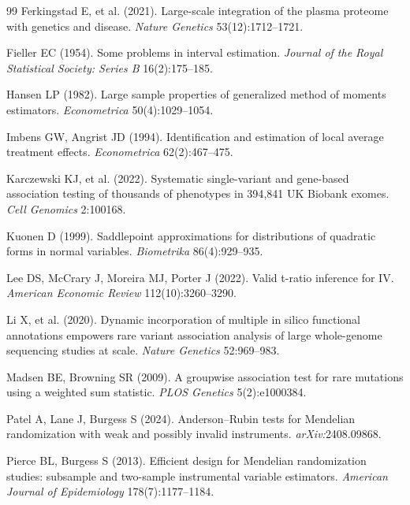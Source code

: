 \documentclass[11pt]{article}
\begin{document}
\begin{thebibliography}{99}
Ferkingstad E, et al. (2021). Large-scale integration of the plasma proteome with genetics and disease. \emph{Nature Genetics} 53(12):1712--1721.

Fieller EC (1954). Some problems in interval estimation. \emph{Journal of the Royal Statistical Society: Series B} 16(2):175--185.

Hansen LP (1982). Large sample properties of generalized method of moments estimators. \emph{Econometrica} 50(4):1029--1054.

Imbens GW, Angrist JD (1994). Identification and estimation of local average treatment effects. \emph{Econometrica} 62(2):467--475.

Karczewski KJ, et al. (2022). Systematic single-variant and gene-based association testing of thousands of phenotypes in 394{,}841 UK Biobank exomes. \emph{Cell Genomics} 2:100168.

Kuonen D (1999). Saddlepoint approximations for distributions of quadratic forms in normal variables. \emph{Biometrika} 86(4):929--935.

Lee DS, McCrary J, Moreira MJ, Porter J (2022). Valid t-ratio inference for IV. \emph{American Economic Review} 112(10):3260--3290.

Li X, et al. (2020). Dynamic incorporation of multiple in silico functional annotations empowers rare variant association analysis of large whole-genome sequencing studies at scale. \emph{Nature Genetics} 52:969--983.

Madsen BE, Browning SR (2009). A groupwise association test for rare mutations using a weighted sum statistic. \emph{PLOS Genetics} 5(2):e1000384.

Patel A, Lane J, Burgess S (2024). Anderson--Rubin tests for Mendelian randomization with weak and possibly invalid instruments. \emph{arXiv:}2408.09868.

Pierce BL, Burgess S (2013). Efficient design for Mendelian randomization studies: subsample and two-sample instrumental variable estimators. \emph{American Journal of Epidemiology} 178(7):1177--1184.


\end{thebibliography}
\end{document}
